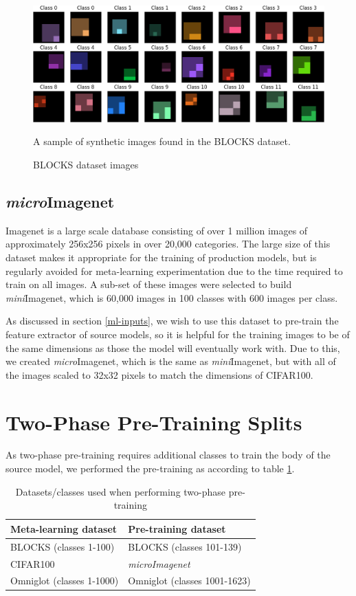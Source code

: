 \documentclass{report}
\begin{document}
\begin{figure}[h]
	\centering
	\includegraphics[width=15cm]{blocks}
	\caption{BLOCKS dataset images}
	A sample of synthetic images found in the BLOCKS dataset.
	\label{fig:blocks:1}
\end{figure}

\subsection{\textit{micro}Imagenet} \label{micro-imagenet}
Imagenet\parencite{ilsvr} is a large scale database consisting of over 1 million images of approximately 256x256 pixels in over 20,000 categories. The large size of this dataset makes it appropriate for the training of production models, but is regularly avoided for meta-learning experimentation due to the time required to train on all images. A sub-set of these images were selected to build \textit{mini}Imagenet\parencite{oaamffsl}, which is 60,000 images in 100 classes with 600 images per class. \par
As discussed in section \ref{ml-inputs}, we wish to use this dataset to pre-train the feature extractor of source models, so it is helpful for the training images to be of the same dimensions as those the model will eventually work with. Due to this, we created \textit{micro}Imagenet, which is the same as \textit{mini}Imagenet, but with all of the images scaled to 32x32 pixels to match the dimensions of CIFAR100.

\section{Two-Phase Pre-Training Splits}
As two-phase pre-training requires additional classes to train the body of the source model, we performed the pre-training as according to table \ref{tab:pre-train}.\par
\begin{table}[h!] \label{tab:pre-train}
	\centering
	\begin{tabular}{|l|l|}
		\hline
		\textbf{Meta-learning dataset} & \textbf{Pre-training dataset} \\ \hline
		BLOCKS (classes 1-100)         & BLOCKS (classes 101-139)      \\ \hline
		CIFAR100                       & \textit{microImagenet}        \\ \hline
		Omniglot (classes 1-1000)      & Omniglot (classes 1001-1623)  \\ \hline
	\end{tabular}
	\caption{Datasets/classes used when performing two-phase pre-training}
\end{table}
\end{document}
